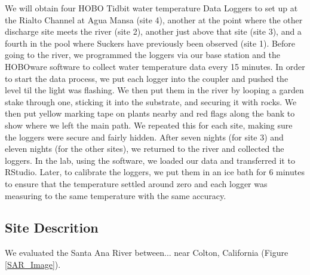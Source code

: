 \documentclass{article}\usepackage[]{graphicx}\usepackage[]{color}
\begin{document}
We will obtain four HOBO Tidbit water temperature Data Loggers to set up at the Rialto Channel at Agua Mansa (site 4), another at the point where the other discharge site meets the river (site 2), another just above that site (site 3), and a fourth in the pool where Suckers have previously been observed (site 1). Before going to the river, we programmed the loggers via our base station and the HOBOware software to collect water temperature data every 15 minutes. In order to start the data process, we put each logger into the coupler and pushed the level til the light was flashing. We then put them in the river by looping a garden stake through one, sticking it into the substrate, and securing it with rocks. We then put yellow marking tape on plants nearby and red flags along the bank to show where we left the main path. We repeated this for each site, making sure the loggers were secure and fairly hidden. After seven nights (for site 3) and eleven nights (for the other sites), we returned to the river and collected the loggers. In the lab, using the software, we loaded our data and transferred it to RStudio. Later, to calibrate the loggers, we put them in an ice bath for 6 minutes to ensure that the temperature settled around zero and each logger was measuring to the same temperature with the same accuracy.

\subsection{Site Descrition}

We evaluated the Santa Ana River between... near Colton, California (Figure \ref{SAR_Image}). 
\end{document}
